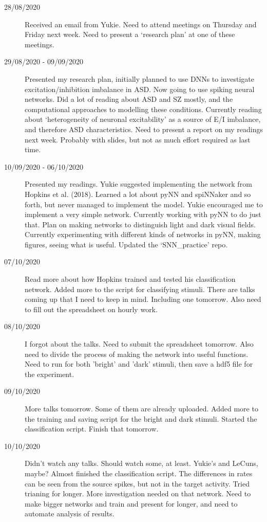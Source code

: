 \documentclass[a4paper,12pt]{article}
\theoremstyle{definition}
\begin{document}
\begin{description}
	\item[28/08/2020] Received an email from Yukie. Need to attend meetings on Thursday and Friday next week. Need to present a `research plan' at one of these meetings.

	\item[29/08/2020 - 09/09/2020] Presented my research plan, initially planned to use DNNs to investigate excitation/inhibition imbalance in ASD. Now going to use spiking neural networks. Did a lot of reading about ASD and SZ mostly, and the computational approaches to modelling these conditions. Currently reading about `heterogeneity of neuronal excitability' as a source of E/I imbalance, and therefore ASD characteristics. Need to present a report on my readings next week. Probably with slides, but not as much effort required as last time.

	\item[10/09/2020 - 06/10/2020] Presented my readings. Yukie suggested implementing the network from Hopkins et al. (2018). Learned a lot about pyNN and spiNNaker and so forth, but never managed to implement the model. Yukie encouraged me to implement a very simple network. Currently working with pyNN to do just that. Plan on making networks to distinguish light and dark visual fields. Currently experimenting with different kinds of networks in pyNN, making figures, seeing what is useful. Updated the `SNN\_practice' repo.

	\item[07/10/2020] Read more about how Hopkins trained and tested his classification network. Added more to the script for classifying stimuli. There are talks coming up that I need to keep in mind. Including one tomorrow. Also need to fill out the spreadsheet on hourly work.

	\item[08/10/2020] I forgot about the talks. Need to submit the spreadsheet tomorrow. Also need to divide the process of making the network into useful functions. Need to run for both 'bright' and 'dark' stimuli, then save a hdf5 file for the experiment.

	\item[09/10/2020] More talks tomorrow. Some of them are already uploaded. Added more to the training and saving script for the bright and dark stimuli. Started the classification script. Finish that tomorrow.

	\item[10/10/2020] Didn't watch any talks. Should watch some, at least. Yukie's and LeCuns, maybe? Almost finished the classification script. The differences in rates can be seen from the source spikes, but not in the target activity. Tried trianing for longer. More investigation needed on that network. Need to make bigger networks and train and present for longer, and need to automate analysis of results.

\end{description}
\end{document}
